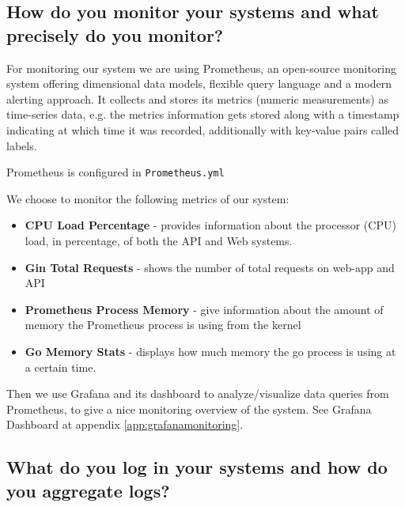 \subsection{How do you monitor your systems and what precisely do you monitor?}
For monitoring our system we are using Prometheus, an open-source monitoring system offering dimensional data models, flexible query language and a modern alerting approach. It collects and stores its metrics (numeric measurements) as time-series data, e.g. the metrics information gets stored along with a timestamp indicating at which time it was recorded, additionally with key-value pairs called labels. 

Prometheus is configured in \texttt{Prometheus.yml} 

We choose to monitor the following metrics of our system:
\begin{itemize}
    \item \textbf{CPU Load Percentage} - provides information about the processor (CPU) load, in percentage, of both the API and Web systems.  
    \item \textbf{Gin Total Requests} - shows the number of total requests on web-app and API
    \item \textbf{Prometheus Process Memory} - give information about the amount of memory the Prometheus process is using from the kernel
    \item \textbf{Go Memory Stats} - displays how much memory the go process is using at a certain time.
\end{itemize}

Then we use Grafana and its dashboard to analyze/visualize data queries from Prometheus, to give a nice monitoring overview of the system. See Grafana Dashboard at appendix \ref{app:grafanamonitoring}.

\subsection{What do you log in your systems and how do you aggregate logs?}

